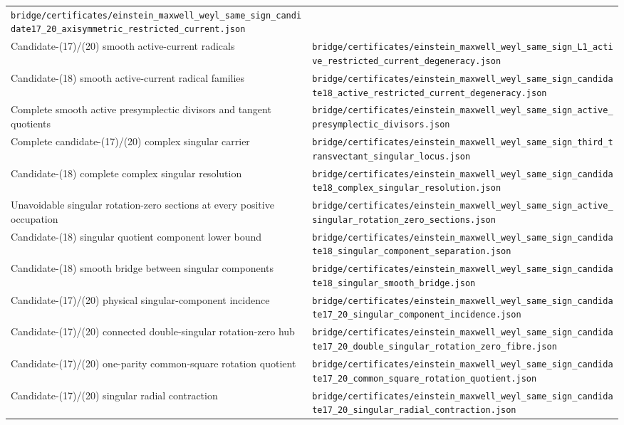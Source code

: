 \documentclass[11pt]{article}
\theoremstyle{definition}
\theoremstyle{remark}
\newcommand{\cert}[1]{\nolinkurl{#1}}
\begin{document}
\begin{longtable}{@{}>{\raggedright\arraybackslash}p{} >{\raggedright\arraybackslash}p{}@{}}
\cert{bridge/certificates/einstein_maxwell_weyl_same_sign_candidate17_20_axisymmetric_restricted_current.json}\\
Candidate-(17)/(20) smooth active-current radicals &
\cert{bridge/certificates/einstein_maxwell_weyl_same_sign_L1_active_restricted_current_degeneracy.json}\\
Candidate-(18) smooth active-current radical families &
\cert{bridge/certificates/einstein_maxwell_weyl_same_sign_candidate18_active_restricted_current_degeneracy.json}\\
Complete smooth active presymplectic divisors and tangent quotients &
\cert{bridge/certificates/einstein_maxwell_weyl_same_sign_active_presymplectic_divisors.json}\\
Complete candidate-(17)/(20) complex singular carrier &
\cert{bridge/certificates/einstein_maxwell_weyl_same_sign_third_transvectant_singular_locus.json}\\
Candidate-(18) complete complex singular resolution &
\cert{bridge/certificates/einstein_maxwell_weyl_same_sign_candidate18_complex_singular_resolution.json}\\
Unavoidable singular rotation-zero sections at every positive occupation &
\cert{bridge/certificates/einstein_maxwell_weyl_same_sign_active_singular_rotation_zero_sections.json}\\
Candidate-(18) singular quotient component lower bound &
\cert{bridge/certificates/einstein_maxwell_weyl_same_sign_candidate18_singular_component_separation.json}\\
Candidate-(18) smooth bridge between singular components &
\cert{bridge/certificates/einstein_maxwell_weyl_same_sign_candidate18_singular_smooth_bridge.json}\\
Candidate-(17)/(20) physical singular-component incidence &
\cert{bridge/certificates/einstein_maxwell_weyl_same_sign_candidate17_20_singular_component_incidence.json}\\
Candidate-(17)/(20) connected double-singular rotation-zero hub &
\cert{bridge/certificates/einstein_maxwell_weyl_same_sign_candidate17_20_double_singular_rotation_zero_fibre.json}\\
Candidate-(17)/(20) one-parity common-square rotation quotient &
\cert{bridge/certificates/einstein_maxwell_weyl_same_sign_candidate17_20_common_square_rotation_quotient.json}\\
Candidate-(17)/(20) singular radial contraction &
\cert{bridge/certificates/einstein_maxwell_weyl_same_sign_candidate17_20_singular_radial_contraction.json}\\

\end{longtable}
\end{document}

